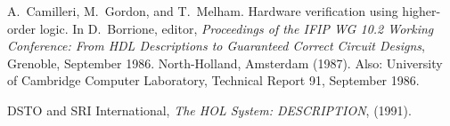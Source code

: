 \begin{thebibliography}{99}

A.~Camilleri, M.~Gordon, and T.~Melham.
\newblock Hardware verification using higher-order logic.
\newblock In D.~Borrione, editor, {\em Proceedings of the {IFIP} {WG} 10.2
  Working Conference: From {HDL} Descriptions to Guaranteed Correct Circuit
  Designs}, Grenoble, September 1986. North-Holland, Amsterdam (1987).
\newblock Also: University of Cambridge Computer Laboratory, Technical Report
  91, September 1986.

{\small DSTO} and {\small SRI} International,
{\it The HOL System: DESCRIPTION}, (1991).

\end{thebibliography}


